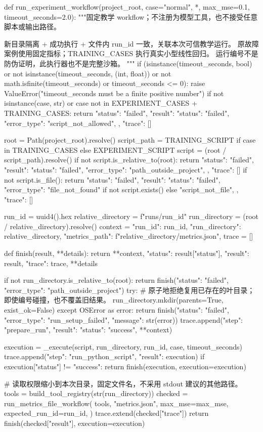 \begin{Code}
def run_experiment_workflow(project_root, case="normal", *, max_mse=0.1, timeout_seconds=2.0):
    """固定教学 workflow；不注册为模型工具，也不接受任意脚本或输出路径。

    新目录隔离 + 成功执行 + 文件内 run_id 一致，关联本次可信教学运行。
    原故障案例使用固定指标；TRAINING_CASES 执行真实小型线性回归。
    运行编号不是防伪证明，此执行器也不是完整沙箱。
    """
    if (isinstance(timeout_seconds, bool) or not isinstance(timeout_seconds, (int, float))
            or not math.isfinite(timeout_seconds) or timeout_seconds <= 0):
        raise ValueError("timeout_seconds must be a finite positive number")
    if not isinstance(case, str) or case not in EXPERIMENT_CASES + TRAINING_CASES:
        return {"status": "failed", "result": {
            "status": "failed", "error_type": "script_not_allowed",
        }, "trace": []}

    root = Path(project_root).resolve()
    script_path = TRAINING_SCRIPT if case in TRAINING_CASES else EXPERIMENT_SCRIPT
    script = (root / script_path).resolve()
    if not script.is_relative_to(root):
        return {"status": "failed", "result": {
            "status": "failed", "error_type": "path_outside_project",
        }, "trace": []}
    if not script.is_file():
        return {"status": "failed", "result": {
            "status": "failed", "error_type": "file_not_found" if not script.exists() else "script_not_file",
        }, "trace": []}

    run_id = uuid4().hex
    relative_directory = f"runs/{run_id}"
    run_directory = (root / relative_directory).resolve()
    context = {
        "run_id": run_id, "run_directory": relative_directory,
        "metrics_path": f"{relative_directory}/metrics.json",
    }
    trace = []

    def finish(result, **details):
        return {**context, "status": result["status"], "result": result, "trace": trace, **details}

    if not run_directory.is_relative_to(root):
        return finish({"status": "failed", "error_type": "path_outside_project"})
    try:
        # 原子地拒绝复用已存在的叶目录；即使编号碰撞，也不覆盖旧结果。
        run_directory.mkdir(parents=True, exist_ok=False)
    except OSError as error:
        return finish({"status": "failed", "error_type": "run_setup_failed", "message": str(error)})
    trace.append({"step": "prepare_run", "result": {"status": "success", **context}})

    execution = _execute(script, run_directory, run_id, case, timeout_seconds)
    trace.append({"step": "run_python_script", "result": execution})
    if execution["status"] != "success":
        return finish(execution, execution=execution)

    # 读取权限缩小到本次目录，固定文件名，不采用 stdout 建议的其他路径。
    tools = build_tool_registry(str(run_directory))
    checked = run_metrics_file_workflow(
        tools, "metrics.json", max_mse=max_mse, expected_run_id=run_id,
    )
    trace.extend(checked["trace"])
    return finish(checked["result"], execution=execution)
\end{Code}

